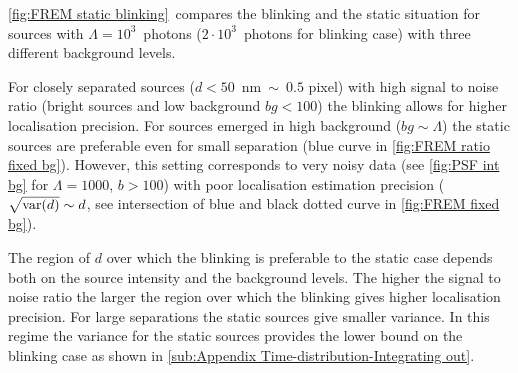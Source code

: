 

\autoref{fig:FREM static blinking}\bbb\ compares the blinking and the static situation for sources with $\Lambda=10^3$~photons ($2\cdot10^3$~photons for blinking case) with three different background levels.

For closely separated sources ($d<50$~nm$\ \sim\ 0.5$ pixel) with high signal to noise ratio (bright sources and low background $bg<100$) the blinking allows for higher localisation precision. For sources emerged in high background ($bg\sim\Lambda$) the static sources are preferable even for small separation (blue curve in \autoref{fig:FREM ratio fixed bg}). However, this setting corresponds to very noisy data (see \autoref{fig:PSF int bg} for $\Lambda=1000$, $b>100$) with poor localisation estimation precision ($\sqrt{\mathrm{var}(d)}\sim d$, see intersection of blue and black dotted curve in \autoref{fig:FREM fixed bg}). 

The region of $d$ over which the blinking is preferable to the static case depends both on the source intensity and the background levels. The higher the signal to noise ratio the larger the region over which the blinking gives higher localisation precision. For large separations the static sources give smaller variance. In this regime the variance for the static sources provides the lower bound on the blinking case as shown in \autoref{sub:Appendix Time-distribution-Integrating out}.

\clearpage
